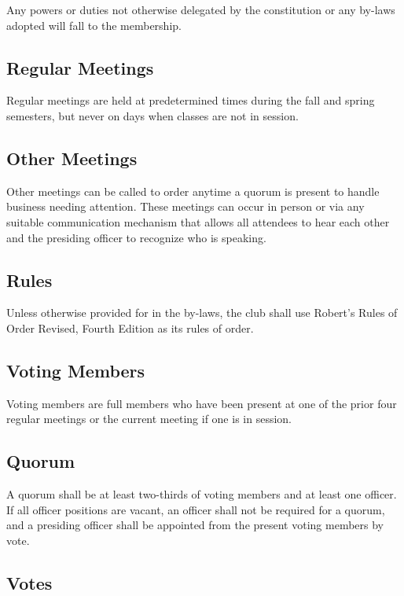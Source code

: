 \documentclass{article}
\begin{document}
Any powers or duties not otherwise delegated by the constitution or any by-laws
adopted will fall to the membership.

\subsection{Regular Meetings}

Regular meetings are held at predetermined times during the fall and spring
semesters, but never on days when classes are not in session.

\subsection{Other Meetings}

Other meetings can be called to order anytime a quorum is present to handle
business needing attention. These meetings can occur in person or via any
suitable communication mechanism that allows all attendees to hear each other
and the presiding officer to recognize who is speaking.

\subsection{Rules}

Unless otherwise provided for in the by-laws, the club shall use Robert's Rules
of Order Revised, Fourth Edition as its rules of order.

\subsection{Voting Members}

Voting members are full members who have been present at one of the prior four
regular meetings or the current meeting if one is in session.

\subsection{Quorum}

A quorum shall be at least two-thirds of voting members and at least one
officer. If all officer positions are vacant, an officer shall not be required
for a quorum, and a presiding officer shall be appointed from the present voting
members by vote.

\subsection{Votes}
\end{document}

